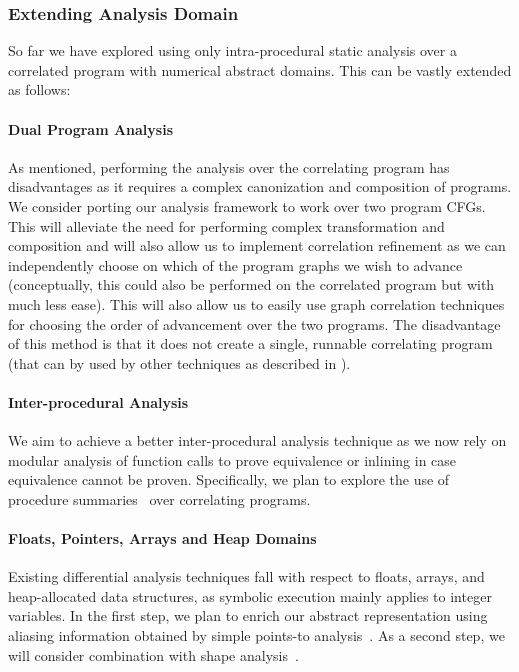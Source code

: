 \subsubsection{Extending Analysis Domain}

So far we have explored using only intra-procedural static analysis over a correlated program with numerical abstract domains. This can be vastly extended as follows:

\paragraph{Dual Program Analysis}
As mentioned, performing the analysis over the correlating program has disadvantages as it requires a complex canonization and composition of programs. We consider porting our analysis framework to work over two program CFGs. This will alleviate the need for performing complex transformation and composition and will also allow us to implement correlation refinement as we can independently choose on which of the program graphs we wish to advance (conceptually, this could also be performed on the correlated program but with much less ease). This will also allow us to easily use graph correlation techniques for choosing the order of advancement over the two programs. The disadvantage of this method is that it does not create a single, runnable correlating program (that can by used by other techniques as described in ).

\paragraph{Inter-procedural Analysis}
We aim to achieve a better inter-procedural analysis technique as we now rely on modular analysis of function calls to prove equivalence or inlining in case equivalence cannot be proven. Specifically, we plan to explore the use of procedure summaries~\cite{RepsHorwitzSagiv95} over correlating programs.

\paragraph{Floats, Pointers, Arrays and Heap Domains}
Existing differential analysis techniques fall with respect to floats, arrays, and heap-allocated data structures, as symbolic execution mainly applies to integer variables. In the first step, we plan to enrich our abstract representation using aliasing information obtained by simple points-to analysis~\cite{Steensgaard96,Andersen94}. As a second step, we will consider combination with shape analysis~\cite{SagivRepsWilhelm02}.

